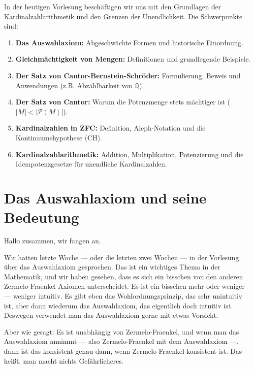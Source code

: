 
\begin{nice-box}
In der heutigen Vorlesung beschäftigen wir uns mit den Grundlagen der Kardinalzahlarithmetik und den Grenzen der Unendlichkeit. Die Schwerpunkte sind:
\begin{enumerate}[label=\textbf{(\arabic*)}]
    \item \textbf{Das Auswahlaxiom:} Abgeschwächte Formen und historische Einordnung.
    \item \textbf{Gleichmächtigkeit von Mengen:} Definitionen und grundlegende Beispiele.
    \item \textbf{Der Satz von Cantor-Bernstein-Schröder:} Formulierung, Beweis und Anwendungen (z.B. Abzählbarkeit von $\mathbb{Q}$).
    \item \textbf{Der Satz von Cantor:} Warum die Potenzmenge stets mächtiger ist ($|M| < |\mathcal{P}(M)|$).
    \item \textbf{Kardinalzahlen in ZFC:} Definition, Aleph-Notation und die Kontinuumshypothese (CH).
    \item \textbf{Kardinalzahlarithmetik:} Addition, Multiplikation, Potenzierung und die Idempotenzgesetze für unendliche Kardinalzahlen.
\end{enumerate}
\end{nice-box}

\section{Das Auswahlaxiom und seine Bedeutung}

\begin{spoken-clean}[00:00:00 - 00:01:55]
Hallo zusammen, wir fangen an.

Wir hatten letzte Woche --- oder die letzten zwei Wochen --- in der Vorlesung über das Auswahlaxiom gesprochen. Das ist ein wichtiges Thema in der Mathematik, und wir haben gesehen, dass es sich ein bisschen von den anderen Zermelo-Fraenkel-Axiomen unterscheidet. Es ist ein bisschen mehr oder weniger --- weniger intuitiv. Es gibt eben das Wohlordnungsprinzip, das sehr unintuitiv ist, aber dann wiederum das Auswahlaxiom, das eigentlich doch intuitiv ist. Deswegen verwendet man das Auswahlaxiom gerne mit etwas Vorsicht.

Aber wie gesagt: Es ist unabhängig von Zermelo-Fraenkel, und wenn man das Auswahlaxiom annimmt --- also Zermelo-Fraenkel mit dem Auswahlaxiom ---, dann ist das konsistent genau dann, wenn Zermelo-Fraenkel konsistent ist. Das heißt, man macht nichts Gefährlicheres.
\end{spoken-clean}

